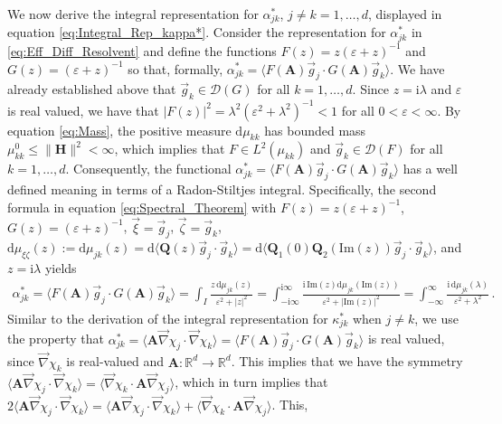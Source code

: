 \documentclass[11pt]{amsart}
\newcommand{\I}{\mathrm{i}}
\renewcommand{\d}{\mathrm{d}}
\newcommand{\Hb}{\mathbf{H}}
\newcommand{\Ab}{\mathbf{A}}
\newcommand{\Qb}{\mathbf{Q}}
\newcommand{\Ds}{\mathscr{D}}
\begin{document}
We now derive the integral representation for $\alpha^*_{jk}$, $j\neq k=1,\ldots,d$,
displayed in equation \eqref{eq:Integral_Rep_kappa*}. Consider the
representation for $\alpha^*_{jk}$ in \eqref{eq:Eff_Diff_Resolvent} and
define the functions $F(z)=z(\varepsilon+z)^{-1}$ and $G(z)=(\varepsilon+z)^{-1}$ so that,
formally, $\alpha^*_{jk}=\langle F(\Ab)\vec{g}_j\cdot G(\Ab)\vec{g}_k\rangle$. We have
already established above that $\vec{g}_k\in\Ds(G)$ for all
$k=1,\ldots,d$. Since $z=\I\lambda$ and $\varepsilon$ is real valued, we have that
$|F(z)|^2=\lambda^2(\varepsilon^2+\lambda^2)^{-1}<1$ for all $0<\varepsilon<\infty$.  By equation
\eqref{eq:Mass}, the positive measure $\d\mu_{kk}$ has bounded mass
$\mu^0_{kk}\leq\|\Hb\|^2<\infty$, which implies that $F\in L^2(\mu_{kk})$ and
$\vec{g}_k\in\Ds(F)$ for all $k=1,\ldots,d$. Consequently, the functional
$\alpha^*_{jk}=\langle F(\Ab)\vec{g}_j\cdot G(\Ab)\vec{g}_k\rangle$ has a well defined
meaning in terms of a Radon-Stiltjes integral. Specifically, the
second formula in equation \eqref{eq:Spectral_Theorem} with
$F(z)=z(\varepsilon+z)^{-1}$, $G(z)=(\varepsilon+z)^{-1}$, $\vec{\xi}=\vec{g}_j$,
$\vec{\zeta}=\vec{g}_k$,
$\d\mu_{\xi\zeta}(z):=\d\mu_{jk}(z)=\d\langle\Qb(z)\vec{g}_j\cdot\vec{g}_k\rangle
=\d\langle\Qb_1(0)\Qb_2(\text{Im}(z))\vec{g}_j\cdot\vec{g}_k\rangle$, and $z=\I\lambda$
yields          
%
\begin{align}\label{eq:Int_kappa*_jk}
  \alpha^*_{jk}=\langle F(\Ab)\vec{g}_j\cdot G(\Ab)\vec{g}_k\rangle
     =\int_I\frac{z\,\d\mu_{jk}(z)}{\varepsilon^2+|z|^2}
     =\int_{-\I\infty}^{\I\infty}\frac{\I\,\text{Im}(z)\d\mu_{jk}(\text{Im}(z))}{\varepsilon^2+|\text{Im}(z)|^2}
     =\int_{-\infty}^\infty\frac{\I\,\d\mu_{jk}(\lambda)}{\varepsilon^2+\lambda^2}\,.
\end{align}
%
Similar to the derivation of the integral representation for
$\kappa^*_{jk}$ when $j\neq k$, we use the property that
$\alpha^*_{jk}=\langle\Ab\vec{\nabla}\chi_j\cdot\vec{\nabla}\chi_k\rangle=\langle F(\Ab)\vec{g}_j\cdot G(\Ab)\vec{g}_k\rangle$ is real
valued, since $\vec{\nabla}\chi_k$ is real-valued and
$\Ab:\mathbb{R}^d\to\mathbb{R}^d$. This implies that we have the symmetry
$\langle\Ab\vec{\nabla}\chi_j\cdot\vec{\nabla}\chi_k\rangle=\langle\vec{\nabla}\chi_k\cdot\Ab\vec{\nabla}\chi_j\rangle$, which in turn
implies that
$2\langle\Ab\vec{\nabla}\chi_j\cdot\vec{\nabla}\chi_k\rangle=\langle\Ab\vec{\nabla}\chi_j\cdot\vec{\nabla}\chi_k\rangle+\langle\vec{\nabla}\chi_k\cdot\Ab\vec{\nabla}\chi_j\rangle$. This,  
\end{document}
